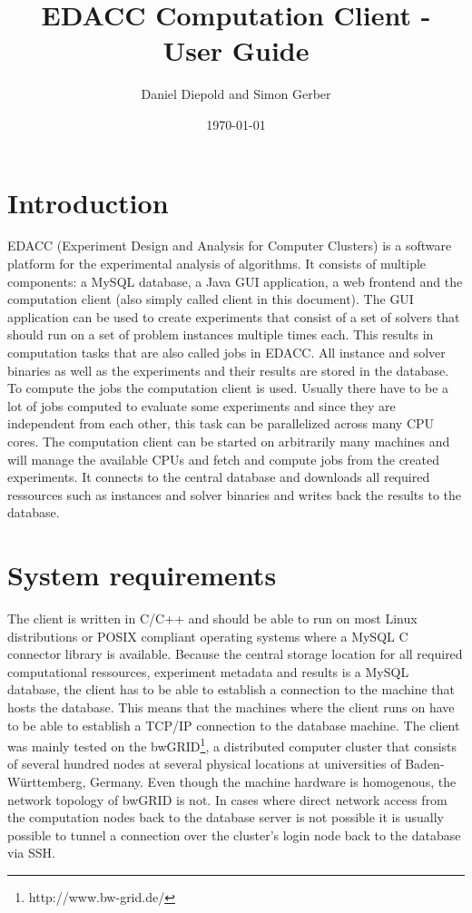 \documentclass{article}
\title{EDACC Computation Client - User Guide}
\author{Daniel Diepold and Simon Gerber}
\date{\today}
\begin{document}
\maketitle
\newpage

\section{Introduction}
EDACC (Experiment Design and Analysis for Computer Clusters) is a software platform for the experimental analysis of algorithms.
It consists of multiple components: a MySQL database, a Java GUI application, a web frontend and the computation client (also simply called client in this document).
The GUI application can be used to create experiments that consist of a set of solvers that should run on a set of problem instances multiple times each.
This results in computation tasks that are also called jobs in EDACC. All instance and solver binaries as well as the experiments
and their results are stored in the database. To compute the jobs the computation client is used. Usually there have to be a lot of jobs computed to evaluate some experiments
and since they are independent from each other, this task can be parallelized across many CPU cores. The computation client can be started on arbitrarily many
machines and will manage the available CPUs and fetch and compute jobs from the created experiments. It connects to the central database and downloads all required ressources
such as instances and solver binaries and writes back the results to the database.

\section{System requirements}
The client is written in C/C++ and should be able to run on most Linux distributions or POSIX compliant operating systems where a MySQL C connector library is available.
Because the central storage location for all required computational ressources, experiment metadata and results is a MySQL database, the client has to be able
to establish a connection to the machine that hosts the database. This means that the machines where the client runs on have to be able to establish a TCP/IP connection
to the database machine. The client was mainly tested on the bwGRID\footnote{{http://www.bw-grid.de/}}, a distributed computer cluster that consists of several hundred
nodes at several physical locations at universities of Baden-Württemberg, Germany. Even though the machine hardware is homogenous, the network topology of bwGRID is not.
In cases where direct network access from the computation nodes back to the database server is not possible it is usually possible to tunnel a connection
over the cluster's login node back to the database via SSH.
\end{document}
